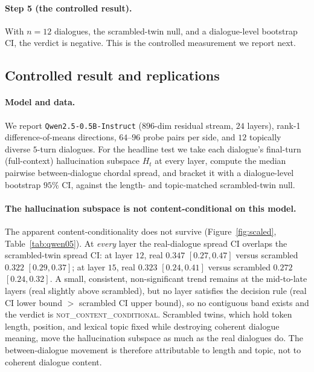 \paragraph{Step 5 (the controlled result).} With $n{=}12$ dialogues, the scrambled-twin null,
and a dialogue-level bootstrap CI, the verdict is negative. This is the controlled measurement
we report next.

\subsection{Controlled result and replications}
\label{sec:res-controlled}

\paragraph{Model and data.} We report \texttt{Qwen2.5-0.5B-Instruct} \citep{qwen25}
($896$-dim residual stream, $24$ layers), rank-1 difference-of-means directions, $64$--$96$
probe pairs per side, and $12$ topically diverse $5$-turn dialogues. For the headline test we
take each dialogue's final-turn (full-context) hallucination subspace $H_t$ at every layer,
compute the median pairwise between-dialogue chordal spread, and bracket it with a
dialogue-level bootstrap $95\%$ CI, against the length- and topic-matched scrambled-twin null.

\paragraph{The hallucination subspace is not content-conditional on this model.} The apparent
content-conditionality does not survive (Figure~\ref{fig:scaled}, Table~\ref{tab:qwen05}). At
\emph{every} layer the real-dialogue spread CI overlaps the scrambled-twin spread CI: at layer
$12$, real $0.347$ $[0.27,0.47]$ versus scrambled $0.322$ $[0.29,0.37]$; at layer $15$, real
$0.323$ $[0.24,0.41]$ versus scrambled $0.272$ $[0.24,0.32]$. A small, consistent,
non-significant trend remains at the mid-to-late layers (real slightly above scrambled), but no
layer satisfies the decision rule (real CI lower bound $>$ scrambled CI upper bound), so no
contiguous band exists and the verdict is \textsc{not\_content\_conditional}. Scrambled twins,
which hold token length, position, and lexical topic fixed while destroying coherent dialogue
meaning, move the hallucination subspace as much as the real dialogues do. The between-dialogue
movement is therefore attributable to length and topic, not to coherent dialogue content.

